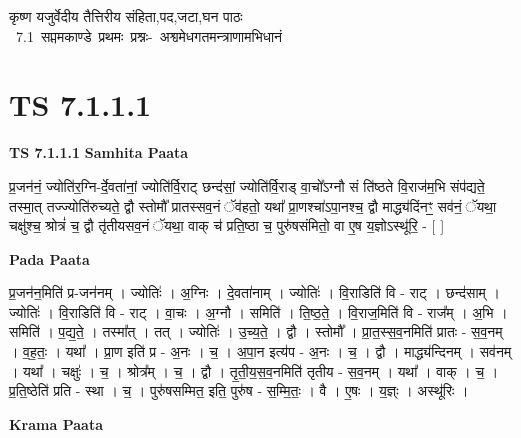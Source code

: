 \documentclass[17pt]{extarticle}
\begin{document}
\begin{titlepage}
    \begin{center}
 
\begin{sanskrit}
    { \Large
    कृष्ण यजुर्वेदीय तैत्तिरीय संहिता,पद,जटा,घन पाठः 
    }
    \\
    \vspace{2.5cm}
    \mbox{ \Large
    7.1      सप्तमकाण्डे प्रथमः प्रश्नः- अश्वमेधगतमन्त्राणामभिधानं   }
\end{sanskrit}
\end{center}

\end{titlepage}
\tableofcontents
{}
\pagebreak


\section{ TS 7.1.1.1 }

\textbf{TS 7.1.1.1 } \newline
\textbf{Samhita Paata} \newline

प्र॒जन॑नं॒ ज्योति॑र॒ग्नि-र्दे॒वता॑नां॒ ज्योति॑र्वि॒राट् छन्द॑सां॒ ज्योति॑र्वि॒राड् वा॒चो᳚ऽग्नौ सं ति॑ष्ठते वि॒राज॑म॒भि संप॑द्यते॒ तस्मा॒त् तज्ज्योति॑रुच्यते॒ द्वौ स्तोमौ᳚ प्रातस्सव॒नं ॅव॑हतो॒ यथा᳚ प्रा॒णश्चा॑ऽपा॒नश्च॒ द्वौ माद्ध्य॑दिंनꣳ॒॒ सव॑नं॒ ॅयथा॒ चक्षु॑श्च॒ श्रोत्रं॑ च॒ द्वौ तृ॑तीयसव॒नं ॅयथा॒ वाक् च॑ प्रति॒ष्ठा च॒ पुरु॑षसंमितो॒ वा ए॒ष य॒ज्ञोऽस्थू॑रि॒ - [  ] \newline

\textbf{Pada Paata} \newline

प्र॒जन॑न॒मिति॑ प्र-जन॑नम् । ज्योतिः॑ । अ॒ग्निः । दे॒वता॑नाम् । ज्योतिः॑ । वि॒राडिति॑ वि - राट् । छन्द॑साम् । ज्योतिः॑ । वि॒राडिति॑ वि - राट् । वा॒चः । अ॒ग्नौ । समिति॑ । ति॒ष्ठ॒ते॒ । वि॒राज॒मिति॑ वि - राज᳚म् । अ॒भि । समिति॑ । प॒द्य॒ते॒ । तस्मा᳚त् । तत् । ज्योतिः॑ । उ॒च्य॒ते॒ । द्वौ । स्तोमौ᳚ । प्रा॒त॒स्स॒व॒नमिति॑ प्रातः - स॒व॒नम् । व॒ह॒तः॒ । यथा᳚ । प्रा॒ण इति॑ प्र - अ॒नः । च॒ । अ॒पा॒न इत्य॑प - अ॒नः । च॒ । द्वौ । माद्ध्य॑न्दिनम् । सव॑नम् । यथा᳚ । चक्षुः॑ । च॒ । श्रोत्र᳚म् । च॒ । द्वौ । तृ॒ती॒य॒स॒व॒नमिति॑ तृतीय - स॒व॒नम् । यथा᳚ । वाक् । च॒ । प्र॒ति॒ष्ठेति॑ प्रति - स्था । च॒ । पुरु॑षसम्मित॒ इति॒ पुरु॑ष - स॒म्मि॒तः॒ । वै । ए॒षः । य॒ज्ञ्ः । अस्थू॑रिः ।  \newline


\textbf{Krama Paata} \newline
\end{document}
